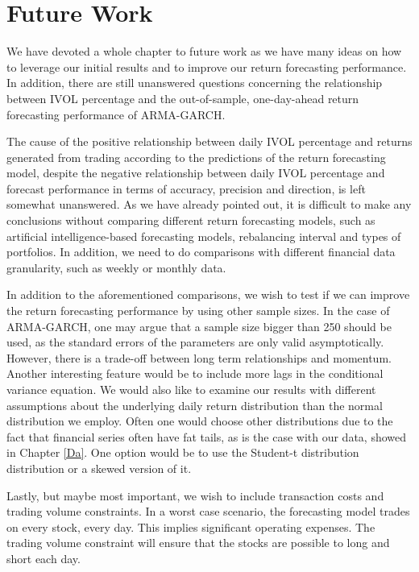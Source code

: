 \chapter{Future Work} \label{FutureWork}
\label{FW}
We have devoted a whole chapter to future work as we have many ideas on how to leverage our initial results and to improve our return forecasting performance. In addition, there are still unanswered questions concerning the relationship between IVOL percentage and the out-of-sample, one-day-ahead return forecasting performance of ARMA-GARCH.

The cause of the positive relationship between daily IVOL percentage and returns generated from trading according to the predictions of the return forecasting model, despite the negative relationship between daily IVOL percentage and forecast performance in terms of accuracy, precision and direction, is left somewhat unanswered. As we have already pointed out, it is difficult to make any conclusions without comparing different return forecasting models, such as artificial intelligence-based forecasting models, rebalancing interval and types of portfolios. In addition, we need to do comparisons with different financial data granularity, such as weekly or monthly data.

In addition to the aforementioned comparisons, we wish to test if we can improve the return forecasting performance by using other sample sizes. In the case of ARMA-GARCH, one may argue that a sample size bigger than 250 should be used, as the standard errors of the parameters are only valid asymptotically. However, there is a trade-off between long term relationships and momentum. Another interesting feature would be to include more lags in the conditional variance equation. We would also like to examine our results with different assumptions about the underlying daily return distribution than the normal distribution we employ. Often one would choose other distributions due to the fact that financial series often have fat tails, as is the case with our data, showed in Chapter \ref{Da}. One option would be to use the Student-t distribution distribution or a skewed version of it.

Lastly, but maybe most important, we wish to include transaction costs and trading volume constraints. In a worst case scenario, the forecasting model trades on every stock, every day. This implies significant operating expenses. The trading volume constraint will ensure that the stocks are possible to long and short each day. 

